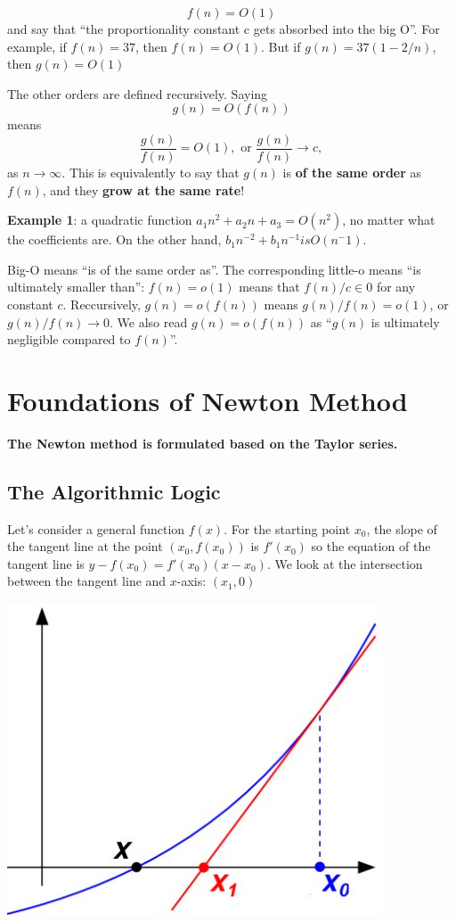 \documentclass[
]{book}
\begin{document}
\[
f(n) = O(1)
\]
and say that ``the proportionality constant c gets absorbed into the big O''. For
example, if \(f (n) = 37\), then \(f (n) = O(1)\). But if \(g (n) = 37(1 -2/n)\), then \(g(n) = O(1)\)

The other orders are defined recursively. Saying
\[
g(n) = O(f(n))
\]
means
\[
\frac{g(n)}{f(n)} = O(1), \text{ or }  \frac{g(n)}{f(n)} \to c,
\]
as \(n \to \infty\). This is equivalently to say that \(g(n)\) is \textbf{of the same order} as \(f(n)\), and they \textbf{grow at the same rate}!

\hfill\break
\textbf{Example 1}: a quadratic function \(a_1n^2 + a_2n + a_3 = O(n^2)\), no matter what the coefficients are. On the other hand, \(b_1n^{-2} + b_1n^{-1} is O(n^-1)\).

Big-O means ``is of the same order as''. The corresponding little-o means ``is ultimately smaller than'': \(f (n) = o(1)\) means that \(f (n)/c \in 0\) for any constant \(c\). Reccursively, \(g (n) = o(f (n))\) means \(g (n)/ f (n) = o(1)\), or \(g (n)/ f (n) \to 0\). We also read \(g (n) = o(f (n))\) as ``\(g (n)\) is ultimately negligible compared to \(f (n)\)''.

\hfill\break

\hypertarget{foundations-of-newton-method}{%
\section{Foundations of Newton Method}\label{foundations-of-newton-method}}

\textbf{The Newton method is formulated based on the Taylor series.}

\hypertarget{the-algorithmic-logic}{%
\subsection{The Algorithmic Logic}\label{the-algorithmic-logic}}

Let's consider a general function \(f(x)\). For the starting point \(x_0\), the slope of the tangent line at the point \((x_0,f(x_0))\) is \(f\prime(x_0)\) so the equation of the tangent line is \(y-f(x_0)=f\prime(x_0)(x-x_0)\). We look at the intersection between the tangent line and \(x\)-axis: \((x_1, 0)\)

\begin{center}\includegraphics[width=0.4\linewidth]{img04/w04-NewtonInitialStep} \end{center}
\end{document}
